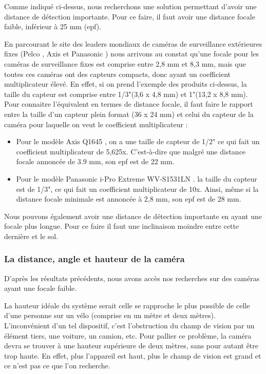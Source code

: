 Comme indiqué ci-dessus, nous recherchons une solution permettant d'avoir une distance de détection importante.
Pour ce faire, il faut avoir une distance focale faible, inférieur à 25 mm (\gls{epf}).

En parcourant le site des leaders mondiaux de caméras de surveillance extérieures fixes
(Pelco \cite{pelco}, Axis \cite{axis} et Panasonic \cite{panasonic})
nous arrivons au constat qu'une focale pour les caméras de surveillance fixes est comprise entre 2,8 mm et 8,3 mm, mais que toutes ces caméras ont des capteurs compacts, donc ayant un coefficient multiplicateur élevé.
En effet, si on prend l'exemple des produits ci-dessus, la taille du capteur est comprise entre 1/3"(3,6 x 4,8 mm) et 1"(13,2 x 8,8 mm).
Pour connaitre l'équivalent en termes de distance focale, il faut faire le rapport entre la taille d'un capteur plein format (36 x 24 mm)
et celui du capteur de la caméra pour laquelle on veut le coefficient multiplicateur :
\begin{itemize}
    \item Pour le modèle Axis Q1645 \cite{axisQ1645}, on a une taille de capteur de 1/2"
          ce qui fait un coefficient multiplicateur de 5,625x. C'est-à-dire que malgré une distance focale annoncée de 3.9 mm, son \gls{epf} est de 22 mm.
    \item Pour le modèle Panasonic i-Pro Extreme WV-S1531LN \cite{panaIPro}.
          la taille du capteur est de 1/3", ce qui fait un coefficient multiplicateur de 10x. Ainsi, même si la distance focale minimale est annoncée à 2,8 mm, son \gls{epf} est de 28 mm.
\end{itemize}

Nous pouvons également avoir une distance de détection importante en ayant une focale plus longue. Pour ce faire il faut une inclinaison moindre entre cette dernière et le sol.


\subsubsection{La distance, angle et hauteur de la caméra}
\label{sec:camera_distance}
D'après les résultats précédents, nous avons accès nos recherches sur des caméras ayant une focale faible.

La hauteur idéale du système serait celle se rapproche le plus possible de celle d'une personne sur un vélo (comprise en un mètre et deux mètres).
L'inconvénient d'un tel dispositif, c'est l'obstruction du champ de vision par un élément tiers, une voiture, un camion, etc. Pour pallier ce problème,
la caméra devra se trouver à une hauteur supérieure de deux mètres, sans pour autant être trop haute. En effet, plus l'appareil est haut,
plus le champ de vision est grand et ce n'est pas ce que l'on recherche.

